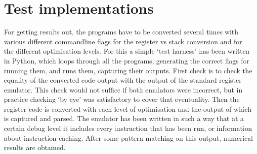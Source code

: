 \section{Test implementations}

For getting results out, the programs have to be converted several times with
various different commandline flags for the register vs stack conversion and for
the different optimisation levels. For this a simple `test harness' has been
written in Python, which loops through all the programs, generating the correct
flags for running them, and runs them, capturing their outputs. First check is
to check the equality of the converted code output with the output of the
standard register emulator. This check would not suffice if both emulators were
incorrect, but in practice checking `by eye' was satisfactory to cover that
eventuality. Then the register code is converted with each level of optimisation
and the output of which is captured and parsed. The emulator has been written in
such a way that at a certain debug level it includes every instruction that has
been run, or information about instruction caching. After some pattern matching
on this output, numerical results are obtained.
